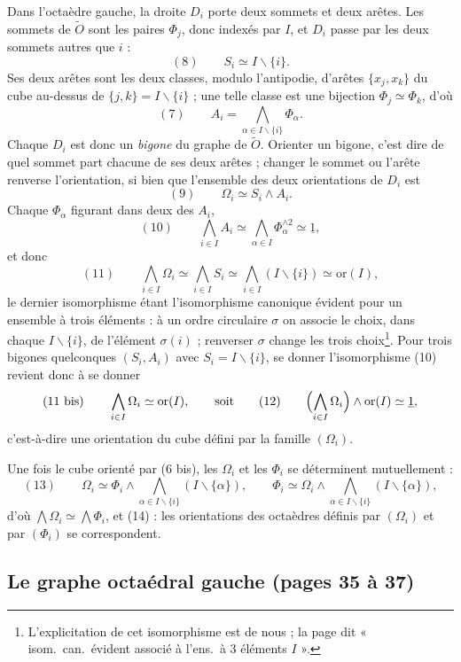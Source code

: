 \documentclass[11pt,a4paper]{article}
\begin{document}
Dans l'octaèdre gauche, la droite $D_i$ porte deux sommets et deux arêtes.
Les sommets de $\widetilde{O}$ sont les paires $\Phi_j$, donc indexés par $I$,
et $D_i$ passe par les deux sommets autres que $i$ :
\[
(8) \qquad S_i \simeq I \smallsetminus \{i\}.
\]
Ses deux arêtes sont les deux classes, modulo l'antipodie, d'arêtes $\{x_j,
x_k\}$ du cube au-dessus de $\{j, k\} = I \smallsetminus \{i\}$ ; une telle
classe est une bijection $\Phi_j \simeq \Phi_k$, d'où
\[
(7) \qquad A_i = \bigwedge_{\alpha \in I \smallsetminus \{i\}} \Phi_\alpha .
\]
Chaque $D_i$ est donc un \emph{bigone} du graphe de $\widetilde{O}$. Orienter
un bigone, c'est dire de quel sommet part chacune de ses deux arêtes ;
changer le sommet ou l'arête renverse l'orientation, si bien que
l'ensemble des deux orientations de $D_i$ est
\[
(9) \qquad \Omega_i \simeq S_i \wedge A_i .
\]
Chaque $\Phi_\alpha$ figurant dans deux des $A_i$,
\[
(10) \qquad \bigwedge_{i \in I} A_i \simeq \bigwedge_{\alpha \in I}
\Phi_\alpha^{\wedge 2} \simeq \underline{1},
\]
et donc
\[
(11) \qquad \bigwedge_{i \in I} \Omega_i \simeq \bigwedge_{i \in I} S_i \simeq
\bigwedge_{i \in I} (I \smallsetminus \{i\}) \simeq \mathrm{or}(I),
\]
le dernier isomorphisme étant l'isomorphisme canonique évident pour un
ensemble à trois éléments : à un ordre circulaire $\sigma$ on associe le
choix, dans chaque $I \smallsetminus \{i\}$, de l'élément $\sigma(i)$ ; renverser
$\sigma$ change les trois choix\footnote{L'explicitation de cet isomorphisme
est de nous ; la page dit « isom.\ can.\ évident associé à l'ens.\ à $3$
éléments $I$ ».}. Pour trois bigones quelconques $(S_i, A_i)$ avec $S_i = I
\smallsetminus \{i\}$, se donner l'isomorphisme (10) revient donc à se donner
\[
(11\ \text{bis}) \qquad \bigwedge_{i \in I} \Omega_i \simeq \mathrm{or}(I), \qquad
\text{soit} \qquad (12) \qquad \Bigl(\bigwedge_{i \in I} \Omega_i\Bigr) \wedge
\mathrm{or}(I) \simeq \underline{1},
\]
c'est-à-dire une orientation du cube défini par la famille $(\Omega_i)$.

Une fois le cube orienté par (6 bis), les $\Omega_i$ et les $\Phi_i$ se
déterminent mutuellement :
\[
(13) \qquad \Omega_i \simeq \Phi_i \wedge \bigwedge_{\alpha \in I
\smallsetminus \{i\}} (I \smallsetminus \{\alpha\}), \qquad \Phi_i \simeq \Omega_i
\wedge \bigwedge_{\alpha \in I \smallsetminus \{i\}} (I \smallsetminus
\{\alpha\}),
\]
d'où $\bigwedge \Omega_i \simeq \bigwedge \Phi_i$, et (14) : les orientations
des octaèdres définis par $(\Omega_i)$ et par $(\Phi_i)$ se correspondent.

\subsection*{Le graphe octaédral gauche (pages 35 à 37)}
\end{document}
